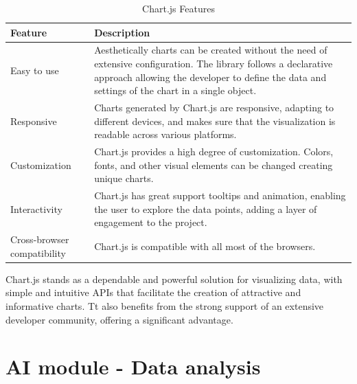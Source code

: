 \begin{table}[H]
    \centering

    \begin{tabularx}{\textwidth}{|l|X|}
        \hline
        \textbf{Feature}            & \textbf{Description}                                                                                                                                                                                                \\
        \hline
        Easy to use                 & Aesthetically charts can be created without the need of extensive configuration. The library follows a declarative approach allowing the developer to define the data and settings of the chart in a single object. \\
        \hline
        Responsive                  & Charts generated by Chart.js are responsive, adapting to different devices, and makes sure that the visualization is readable across various platforms.                              \\
        \hline
        Customization               & Chart.js provides a high degree of customization. Colors, fonts, and other visual elements can be changed creating unique charts.                                                      \\
        \hline
        Interactivity               & Chart.js has great support tooltips and animation, enabling the user to explore the data points, adding a layer of engagement to the project.                                                               \\
        \hline
        Cross-browser compatibility & Chart.js is compatible with all most of the browsers.                                                                                                 \\
        \hline
    \end{tabularx}
    \label{tab:chart-js-features}
    \caption{Chart.js Features}
\end{table}

Chart.js stands as a dependable and powerful solution for visualizing data, with simple and intuitive APIs that facilitate the creation of attractive and
informative charts. Tt also benefits from the strong support of an extensive developer community, offering a significant advantage.


\section{AI module - Data analysis}

